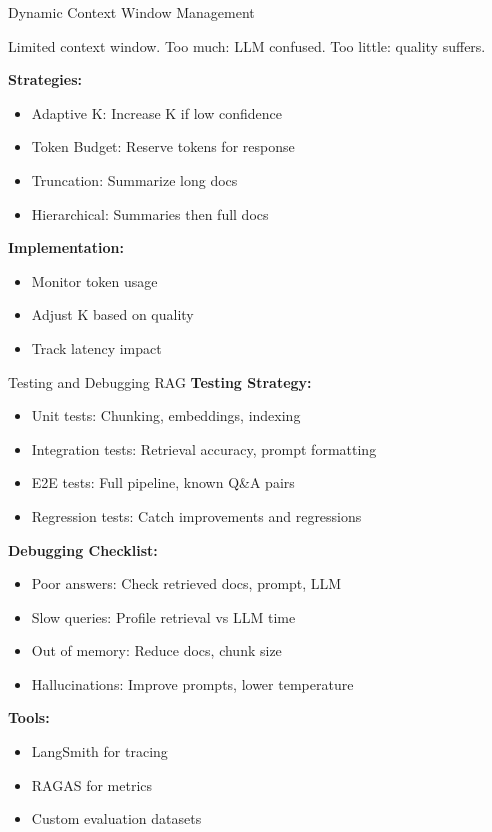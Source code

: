 \documentclass[aspectratio=169,11pt]{beamer}
\begin{document}
\begin{frame}{Dynamic Context Window Management}
  \begin{warningbox}[Challenge]
    Limited context window. Too much: LLM confused. Too little: quality suffers.
  \end{warningbox}

  \textbf{Strategies:}
  \begin{itemize}
    \setlength{\itemsep}{1pt}
    \item Adaptive K: Increase K if low confidence
    \item Token Budget: Reserve tokens for response
    \item Truncation: Summarize long docs
    \item Hierarchical: Summaries then full docs
  \end{itemize}

  \textbf{Implementation:}
  \begin{itemize}
    \setlength{\itemsep}{1pt}
    \item Monitor token usage
    \item Adjust K based on quality
    \item Track latency impact
  \end{itemize}
\end{frame}

\begin{frame}{Testing and Debugging RAG}
  \textbf{Testing Strategy:}
  \begin{itemize}
    \setlength{\itemsep}{1pt}
    \item Unit tests: Chunking, embeddings, indexing
    \item Integration tests: Retrieval accuracy, prompt formatting
    \item E2E tests: Full pipeline, known Q\&A pairs
    \item Regression tests: Catch improvements and regressions
  \end{itemize}

  \textbf{Debugging Checklist:}
  \begin{itemize}
    \setlength{\itemsep}{1pt}
    \item Poor answers: Check retrieved docs, prompt, LLM
    \item Slow queries: Profile retrieval vs LLM time
    \item Out of memory: Reduce docs, chunk size
    \item Hallucinations: Improve prompts, lower temperature
  \end{itemize}

  \textbf{Tools:}
  \begin{itemize}
    \setlength{\itemsep}{1pt}
    \item LangSmith for tracing
    \item RAGAS for metrics
    \item Custom evaluation datasets
  \end{itemize}
\end{frame}
\end{document}
